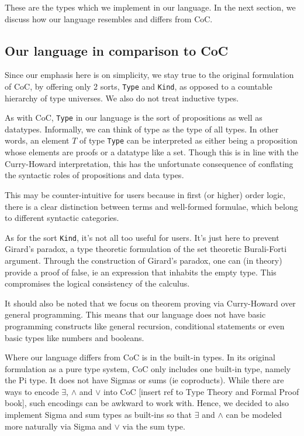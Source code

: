 \documentclass{article}
\begin{document}
These are the types which we implement in our language.
In the next section, we discuss how our language resembles and differs from
CoC.

\subsection{Our language in comparison to CoC}
Since our emphasis here is on simplicity, we stay true to the original
formulation of CoC, by offering only 2 sorts, \verb|Type| and \verb|Kind|, as
opposed to a countable hierarchy of type universes. We also do not treat inductive
types.

As with CoC, \verb|Type| in our language is the sort of propositions as well as 
datatypes. Informally, we can think of type as the type of all types.
In other words, an element $T$ of type \verb|Type| can be interpreted as either
being a proposition whose elements are proofs or a datatype like a set.
Though this is in line with the Curry-Howard interpretation, this has the
unfortunate consequence of conflating the syntactic roles of propositions and
data types.
  
This may be counter-intuitive for users because in first (or higher) order
logic, there is a clear distinction between terms and well-formed formulae,
which belong to different syntactic categories. 

As for the sort \verb|Kind|, it's not all too useful for users. It's
just here to prevent Girard's paradox, a type theoretic formulation of the set
theoretic Burali-Forti argument.
Through the construction of Girard's paradox, one can (in theory) provide a 
proof of false, ie an expression that inhabits the empty type.
This compromises the logical consistency of the calculus.

It should also be noted that we focus on theorem proving via Curry-Howard over
general programming. This means that our language does not have
basic programming constructs like general recursion, conditional statements or
even basic types like numbers and booleans.

Where our language differs from CoC is in the built-in types.
In its original formulation as a pure type system, CoC only includes one built-in
type, namely the Pi type. It does not have Sigmas or sums (ie coproducts).
While there are ways to encode $\exists$, $\wedge$ and $\vee$ into CoC
[insert ref to Type Theory and Formal Proof book], such encodings can be awkward
to work with. Hence, we decided to also implement Sigma and sum types as built-ins
so that $\exists$ and $\wedge$ can be modeled more naturally via Sigma and
$\vee$ via the sum type.
\end{document}

